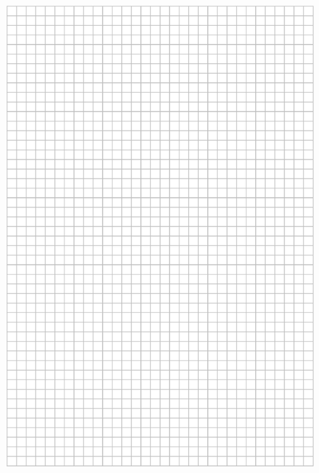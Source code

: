 \documentclass[10pt]{article}
\begin{document}
\includegraphics[max width=\textwidth, center]{2024_11_21_465acd0c12fa3e05e8a7g-25}
\end{document}
